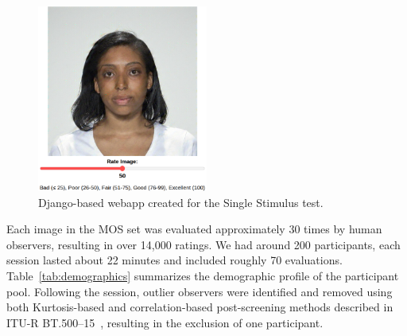 \begin{figure}
    \centering
    \includegraphics[width=0.5\textwidth]{images/webapp_test.png}
    \caption{Django-based webapp created for the Single Stimulus test.}\label{fig:webapp}
\end{figure}

Each image in the MOS set was evaluated approximately 30 times by human observers, resulting in over 14,000 ratings. We had around 200 participants, each session lasted about 22 minutes and included roughly 70 evaluations. Table~\ref{tab:demographics} summarizes the demographic profile of the participant pool. Following the session, outlier observers were identified and removed using both Kurtosis-based and correlation-based post-screening methods described in ITU-R BT.500--15~\cite{ITU-R-BT500}, resulting in the exclusion of one participant.

